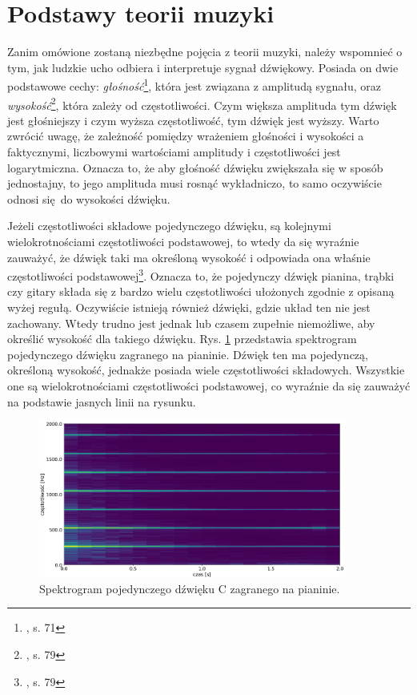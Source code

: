 \section{Podstawy teorii muzyki}

Zanim omówione zostaną niezbędne pojęcia z teorii muzyki, należy wspomnieć o tym, jak ludzkie ucho odbiera i interpretuje sygnał dźwiękowy. Posiada on dwie podstawowe cechy: \emph{głośność}\footnote{\cite{lerch_introduction_2012}, s. 71}, która jest związana z amplitudą sygnału, oraz \emph{wysokość}\footnote{\cite{lerch_introduction_2012}, s. 79}, która zależy od częstotliwości. Czym większa amplituda tym dźwięk jest głośniejszy i czym wyższa częstotliwość, tym dźwięk jest wyższy. Warto zwrócić uwagę, że zależność pomiędzy wrażeniem głośności i wysokości a faktycznymi, liczbowymi wartościami amplitudy i częstotliwości jest logarytmiczna. Oznacza to, że aby głośność dźwięku zwiększała się w sposób jednostajny, to jego amplituda musi rosnąć wykładniczo, to samo oczywiście odnosi się do wysokości dźwięku. 

Jeżeli częstotliwości składowe pojedynczego dźwięku, są kolejnymi wielokrotnościami częstotliwości podstawowej, to wtedy da się wyraźnie zauważyć, że dźwięk taki ma określoną wysokość i odpowiada ona właśnie częstotliwości podstawowej\footnote{\cite{lerch_introduction_2012}, s. 79}. Oznacza to, że pojedynczy dźwięk pianina, trąbki czy gitary składa się z bardzo wielu częstotliwości ułożonych zgodnie z opisaną wyżej regułą. Oczywiście istnieją również dźwięki, gdzie układ ten nie jest zachowany. Wtedy trudno jest jednak lub czasem zupełnie niemożliwe, aby określić wysokość dla takiego dźwięku. Rys. \ref{fig:spektrogram_c} przedstawia spektrogram pojedynczego dźwięku zagranego na pianinie. Dźwięk ten ma pojedynczą, określoną wysokość, jednakże posiada wiele częstotliwości składowych. Wszystkie one są wielokrotnościami częstotliwości podstawowej, co wyraźnie da się zauważyć na podstawie jasnych linii na rysunku.

\begin{figure}[htb]
    \centering
    \includegraphics[width=0.9\textwidth]{images/spektrogram_c}
    \caption{Spektrogram pojedynczego dźwięku C zagranego na pianinie.}
    \label{fig:spektrogram_c}
\end{figure}


